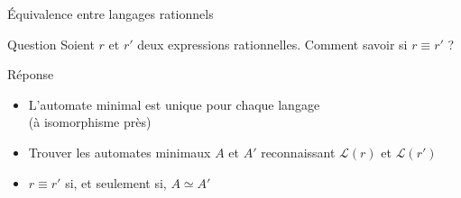 
\begingroup

\begin{frame}{Équivalence entre langages rationnels}
  \begin{alertblock}{Question}
    Soient $r$ et $r'$ deux expressions rationnelles.
    Comment savoir si $r \equiv r'$ ? 
  \end{alertblock}
  
  \begin{block}{Réponse}
    \begin{itemize}
    \item L'automate minimal est unique pour chaque langage \\(à isomorphisme près)
    \item Trouver les automates minimaux $A$ et $A'$ reconnaissant $\mathscr{L}(r)$ et $\mathscr{L}(r')$ 
    \item $r \equiv r'$ si, et seulement si, $A \simeq A'$
    \end{itemize}
  \end{block}

\end{frame}


\endgroup
